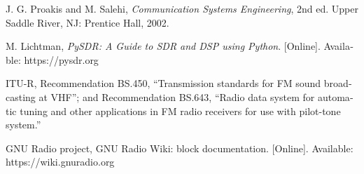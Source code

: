 \documentclass[a4paper,11pt]{article}
\begin{document}


\begin{latin}\small
\begin{enumerate}[label={[\arabic*]},leftmargin=2.2em,itemsep=1pt]
\item J. G. Proakis and M. Salehi, \textit{Communication Systems Engineering}, 2nd ed. Upper Saddle River, NJ: Prentice Hall, 2002.
\item M. Lichtman, \textit{PySDR: A Guide to SDR and DSP using Python}. [Online]. Available: https://pysdr.org
\item ITU-R, Recommendation BS.450, ``Transmission standards for FM sound broadcasting at VHF''; and Recommendation BS.643, ``Radio data system for automatic tuning and other applications in FM radio receivers for use with pilot-tone system.''
\item GNU Radio project, GNU Radio Wiki: block documentation. [Online]. Available: https://wiki.gnuradio.org
\end{enumerate}
\end{latin}
\end{document}
